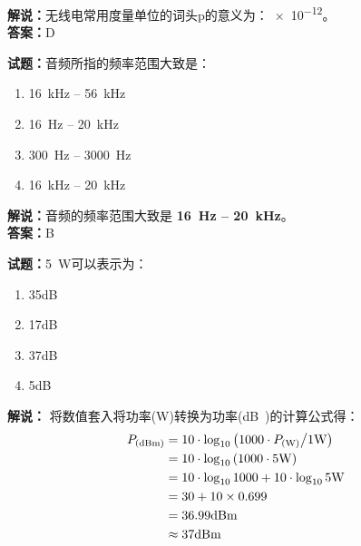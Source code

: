\documentclass{ctexbook}
\begin{document}
\noindent\textbf{解说：}无线电常用度量单位的词头p的意义为：\num{e-12}。\\
\noindent\textbf{答案：}D

\bigskip

\noindent\textbf{试题：}音频所指的频率范围大致是：

\begin{enumerate}[leftmargin=3em]
  \item \qty{16}{\kHz} -- \qty{56}{\kHz}
  \item \qty{16}{\hertz} -- \qty{20}{\kHz}
  \item \qty{300}{\hertz} -- \qty{3000}{\hertz}
  \item \qty{16}{\kHz} -- \qty{20}{\kHz}
\end{enumerate}

\noindent\textbf{解说：}音频的频率范围大致是 \textbf{\qty{16}{\hertz} -- \qty{20}{\kHz}}。\\\noindent\textbf{答案：}B

\bigskip

\noindent\textbf{试题：}\qty{5}{\watt}可以表示为：

\begin{enumerate}[leftmargin=3em]
  \item \num{35}\unit[qualifier-mode=combine]{\deci\bel{}}
  \item \num{17}\unit[qualifier-mode=combine]{\deci\bel{}}
  \item \num{37}\unit[qualifier-mode=combine]{\deci\bel{}}
  \item \num{5}\unit[qualifier-mode=combine]{\deci\bel{}}
\end{enumerate}

\noindent\textbf{解说：}
将数值套入将功率(\unit{\watt})转换为功率(\unit[qualifier-mode=combine]{\deci\bel{}})的计算公式得：
\begin{equation*}
  \begin{aligned}
    P_{(\unit[qualifier-mode=combine]{\deci\bel\of{m}})} & = 10 \cdot \log_{10} \left( 1000 \cdot P_{(\unit{\watt})} \middle/ 1 \unit{\watt} \right) \\
                                                         & = 10 \cdot \log_{10} \left( 1000 \cdot 5 \unit{\watt} \right)                             \\
                                                         & = 10 \cdot \log_{10} 1000 + 10 \cdot \log_{10} 5 \unit{\watt}                             \\
                                                         & = 30 + 10 \times 0.699                                                                    \\
                                                         & = 36.99 \unit[qualifier-mode=combine]{\deci\bel\of{m}}                                    \\
                                                         & \approx 37     \unit[qualifier-mode=combine]{\deci\bel\of{m}}
  \end{aligned}
\end{equation*}
\end{document}
